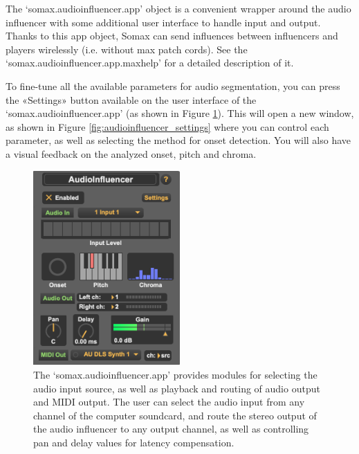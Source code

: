 The `somax.audioinfluencer.app' object is a convenient wrapper around the audio influencer with some additional user interface to handle input and output. Thanks to this app object, Somax can send influences between influencers and players wirelessly (i.e. without max patch cords). 
See the `somax.audioinfluencer.app.maxhelp' for a detailed description of it. 

To fine-tune all the available parameters for audio segmentation, you can press the «Settings» button available on the user interface of the `somax.audioinfluencer.app' (as shown in Figure \ref{fig:audioinfluencer_app}). This will open a new window, as shown in Figure \ref{fig:audioinfluencer_settings} where you can control each parameter, as well as selecting the method for onset detection. You will also have a visual feedback on the analyzed onset, pitch and chroma.


 \begin{figure}[H]
    \centering        
 	\includegraphics[width=0.5\textwidth, keepaspectratio]{img/audioinfluencer_app.png}
    \caption{The `somax.audioinfluencer.app' provides modules for selecting the audio input source, as well as playback and routing of audio output and MIDI output. The user can select the audio input from any channel of the computer soundcard, and route the stereo output of the audio influencer to any output channel, as well as controlling pan and delay values for latency compensation.}
    \label{fig:audioinfluencer_app}
\end{figure}


